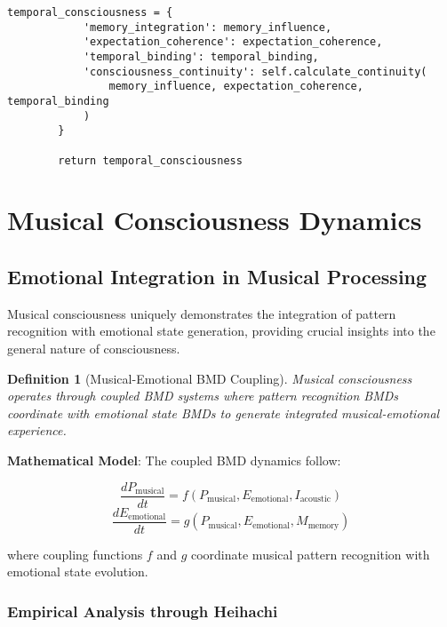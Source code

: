 \documentclass[12pt,a4paper]{article}
\newtheorem{definition}[theorem]{Definition}
\begin{document}
\begin{lstlisting}[style=pythonstyle, caption=Musical Temporal Memory Processing]
        temporal_consciousness = {
            'memory_integration': memory_influence,
            'expectation_coherence': expectation_coherence,
            'temporal_binding': temporal_binding,
            'consciousness_continuity': self.calculate_continuity(
                memory_influence, expectation_coherence, temporal_binding
            )
        }
        
        return temporal_consciousness
\end{lstlisting}

\section{Musical Consciousness Dynamics}

\subsection{Emotional Integration in Musical Processing}

Musical consciousness uniquely demonstrates the integration of pattern recognition with emotional state generation, providing crucial insights into the general nature of consciousness.

\begin{definition}[Musical-Emotional BMD Coupling]
Musical consciousness operates through coupled BMD systems where pattern recognition BMDs coordinate with emotional state BMDs to generate integrated musical-emotional experience.
\end{definition}

\textbf{Mathematical Model}:
The coupled BMD dynamics follow:

$$\frac{dP_{\text{musical}}}{dt} = f(P_{\text{musical}}, E_{\text{emotional}}, I_{\text{acoustic}})$$
$$\frac{dE_{\text{emotional}}}{dt} = g(P_{\text{musical}}, E_{\text{emotional}}, M_{\text{memory}})$$

where coupling functions $f$ and $g$ coordinate musical pattern recognition with emotional state evolution.

\subsubsection{Empirical Analysis through Heihachi}
\end{document}
